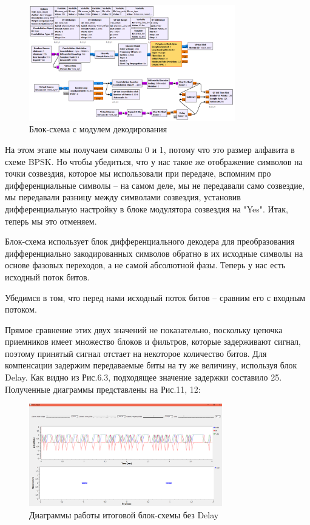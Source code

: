 \documentclass[12pt]{article}
\begin{document}
\begin{figure}[H]
    \centering
    \includegraphics[width=0.8\textwidth]{pics/a0000-img010.png}
    \caption{Блок-схема с модулем декодирования}
\end{figure}

\pagebreak

На этом этапе мы получаем символы 0 и 1, потому что это размер алфавита в схеме BPSK. Но чтобы убедиться, что у нас такое же отображение символов на точки созвездия, которое мы использовали при передаче, вспомним про дифференциальные символы – на самом деле, мы не передавали само созвездие, мы передавали разницу между символами созвездия, установив дифференциальную настройку в блоке модулятора созвездия на "Yes". Итак, теперь мы это отменяем.

Блок-схема использует блок дифференциального декодера для преобразования дифференциально закодированных символов обратно в их исходные символы на основе фазовых переходов, а не самой абсолютной фазы. Теперь у нас есть исходный поток битов.

Убедимся в том, что перед нами исходный поток битов – сравним его с входным потоком. 

Прямое сравнение этих двух значений не показательно, поскольку цепочка приемников имеет множество блоков и фильтров, которые задерживают сигнал, поэтому принятый сигнал отстает на некоторое количество битов. Для компенсации задержим передаваемые биты на ту же величину, используя блок Delay. Как видно из Рис.6.3, подходящее значение задержки составило 25. Полученные диаграммы представлены на Рис.11, 12:

\begin{figure}[H]
    \centering
    \includegraphics[width=0.75\textwidth]{pics/a0000-img011.png}
    \caption{Диаграммы работы итоговой блок-схемы без Delay}
\end{figure}
\end{document}
